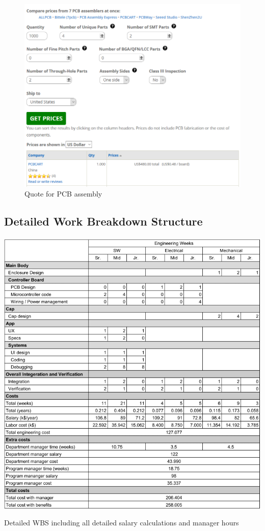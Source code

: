 \documentclass[12pt]{article}
\begin{document}
		\begin{figure}[H]
			\centering
			\includegraphics[width=\textwidth]{quote3.png}
			\caption{Quote for PCB assembly}
		\end{figure}
		\subsection*{Detailed Work Breakdown Structure}
		\begin{table}[H]
			\centering
			\includegraphics[width=\textwidth]{wbs_large3.png}
			\caption{ Detailed WBS including all detailed salary calculations and manager hours}
		\end{table}
\end{document}
